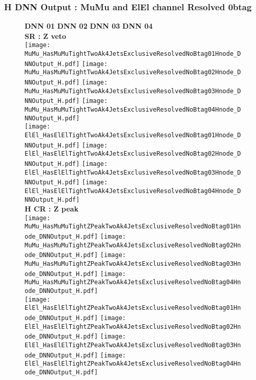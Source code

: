 \documentclass[9pt]{beamer}
\begin{document}
\begin{frame}
	\frametitle{H DNN Output : MuMu and ElEl channel Resolved 0btag}
	\begin{figure}
	    \textbf{DNN 01} \hspace{1.2cm} \textbf{DNN 02} \hspace{1.2cm} \textbf{DNN 03} \hspace{1.2cm} \textbf{DNN 04} \\
        \centering
        \textbf{SR : Z veto} \\
		\texttt{[image: MuMu\_HasMuMuTightTwoAk4JetsExclusiveResolvedNoBtag01Hnode\_DNNOutput\_H.pdf]}
		\texttt{[image: MuMu\_HasMuMuTightTwoAk4JetsExclusiveResolvedNoBtag02Hnode\_DNNOutput\_H.pdf]}
		\texttt{[image: MuMu\_HasMuMuTightTwoAk4JetsExclusiveResolvedNoBtag03Hnode\_DNNOutput\_H.pdf]}
		\texttt{[image: MuMu\_HasMuMuTightTwoAk4JetsExclusiveResolvedNoBtag04Hnode\_DNNOutput\_H.pdf]}\\
		\texttt{[image: ElEl\_HasElElTightTwoAk4JetsExclusiveResolvedNoBtag01Hnode\_DNNOutput\_H.pdf]}
		\texttt{[image: ElEl\_HasElElTightTwoAk4JetsExclusiveResolvedNoBtag02Hnode\_DNNOutput\_H.pdf]}
		\texttt{[image: ElEl\_HasElElTightTwoAk4JetsExclusiveResolvedNoBtag03Hnode\_DNNOutput\_H.pdf]}
		\texttt{[image: ElEl\_HasElElTightTwoAk4JetsExclusiveResolvedNoBtag04Hnode\_DNNOutput\_H.pdf]}\\
        \textbf{H CR : Z peak} \\
		\texttt{[image: MuMu\_HasMuMuTightZPeakTwoAk4JetsExclusiveResolvedNoBtag01Hnode\_DNNOutput\_H.pdf]}
		\texttt{[image: MuMu\_HasMuMuTightZPeakTwoAk4JetsExclusiveResolvedNoBtag02Hnode\_DNNOutput\_H.pdf]}
		\texttt{[image: MuMu\_HasMuMuTightZPeakTwoAk4JetsExclusiveResolvedNoBtag03Hnode\_DNNOutput\_H.pdf]}
		\texttt{[image: MuMu\_HasMuMuTightZPeakTwoAk4JetsExclusiveResolvedNoBtag04Hnode\_DNNOutput\_H.pdf]}\\
		\texttt{[image: ElEl\_HasElElTightZPeakTwoAk4JetsExclusiveResolvedNoBtag01Hnode\_DNNOutput\_H.pdf]}
		\texttt{[image: ElEl\_HasElElTightZPeakTwoAk4JetsExclusiveResolvedNoBtag02Hnode\_DNNOutput\_H.pdf]}
		\texttt{[image: ElEl\_HasElElTightZPeakTwoAk4JetsExclusiveResolvedNoBtag03Hnode\_DNNOutput\_H.pdf]}
		\texttt{[image: ElEl\_HasElElTightZPeakTwoAk4JetsExclusiveResolvedNoBtag04Hnode\_DNNOutput\_H.pdf]}\\
	\end{figure}
\end{frame}
\end{document}

